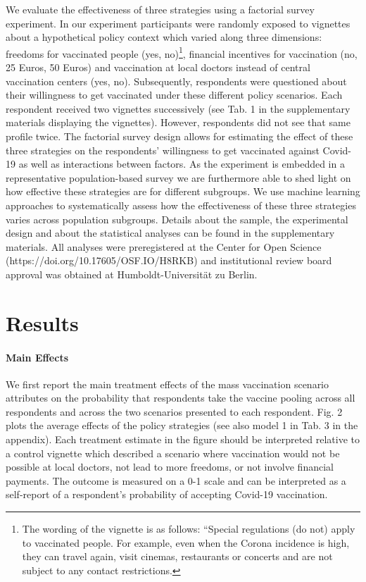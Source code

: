 \documentclass[12pt]{article}
\begin{document}
We evaluate the effectiveness of three strategies using a factorial survey experiment. In our experiment participants were randomly exposed to vignettes about a hypothetical policy context which varied along three dimensions: freedoms for vaccinated people (yes, no)\footnote{The wording of the vignette is as follows: ``Special regulations (do not) apply to vaccinated people. For example, even when the Corona incidence is high, they can travel again, visit cinemas, restaurants or concerts and are not subject to any contact restrictions.}, financial incentives for vaccination (no, 25 Euros, 50 Euros) and vaccination at local doctors instead of central vaccination centers (yes, no). Subsequently, respondents were questioned about their willingness to get vaccinated under these different policy scenarios. Each respondent received two vignettes successively (see Tab. 1 in the supplementary materials displaying the vignettes). However, respondents did not see that same profile twice. The factorial survey design allows for estimating the effect of these three strategies on the respondents' willingness to get vaccinated against Covid-19 as well as interactions between factors. As the experiment is embedded in a representative population-based survey we are furthermore able to shed light on how effective these strategies are for different subgroups. We use machine learning approaches to systematically assess how the effectiveness of these three strategies varies across population subgroups. Details about the sample, the experimental design and about the statistical analyses can be found in the supplementary materials. All analyses were preregistered at the Center for Open Science (https://doi.org/10.17605/OSF.IO/H8RKB) and institutional review board approval was obtained at Humboldt-Universität zu Berlin.


\section*{Results}


\paragraph*{Main Effects}  
We first report the main treatment effects of the mass vaccination scenario attributes on the probability that respondents take the vaccine pooling across all respondents and across the two scenarios presented to each respondent. Fig. 2 plots the average effects of the policy strategies (see also model 1 in Tab. 3 in the appendix). Each treatment estimate in the figure should be interpreted relative to a control vignette which described a scenario where vaccination would not be possible at local doctors, not lead to more freedoms, or not involve financial payments. The outcome is measured on a 0-1 scale and can be interpreted as a self-report of a respondent's probability of accepting Covid-19 vaccination.
\end{document}
